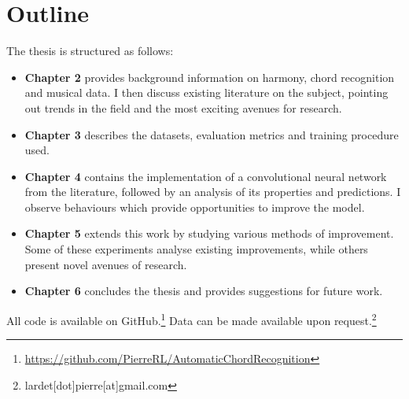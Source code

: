 \section{Outline}

The thesis is structured as follows:

\begin{itemize}
    \item \textbf{Chapter 2} provides background information on harmony, chord recognition and musical data. I then discuss existing literature on the subject, pointing out trends in the field and the most exciting avenues for research.
    \item \textbf{Chapter 3} describes the datasets, evaluation metrics and training procedure used.
    \item \textbf{Chapter 4} contains the implementation of a convolutional neural network from the literature, followed by an analysis of its properties and predictions. I observe behaviours which provide opportunities to improve the model. 
    \item \textbf{Chapter 5} extends this work by studying various methods of improvement. Some of these experiments analyse existing improvements, while others present novel avenues of research.
    \item \textbf{Chapter 6} concludes the thesis and provides suggestions for future work.
\end{itemize}

\vspace{0.5cm}

All code is available on GitHub.\footnote{\url{https://github.com/PierreRL/AutomaticChordRecognition}} Data can be made available upon request.\footnote{lardet[dot]pierre[at]gmail.com}